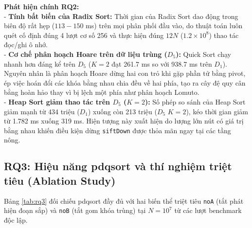 \documentclass[conference]{IEEEtran}
\begin{document}
\textbf{Phát hiện chính RQ2:}\\
- \textbf{Tính bất biến của Radix Sort:} Thời gian của Radix Sort dao động trong biên độ rất hẹp ($113 - 150$ ms) trên mọi phân phối đầu vào, do thuật toán luôn quét cố định đúng 4 lượt cơ số 256 và thực hiện đúng $12N$ ($1.2\times 10^8$) thao tác đọc/ghi ô nhớ.\\
- \textbf{Cơ chế phân hoạch Hoare trên dữ liệu trùng ($D_5$):} Quick Sort chạy nhanh hơn đáng kể trên $D_5$ ($K=2$ đạt 261.7 ms so với 938.7 ms trên $D_1$). Nguyên nhân là phân hoạch Hoare dừng hai con trỏ khi gặp phần tử bằng pivot, ép việc hoán đổi các khóa bằng nhau chia đều về hai phía, tạo ra cây đệ quy cân bằng hoàn hảo thay vì bị lệch một phía như phân hoạch Lomuto.\\
- \textbf{Heap Sort giảm thao tác trên $D_5$ ($K=2$):} Số phép so sánh của Heap Sort giảm mạnh từ 434 triệu ($D_1$) xuống còn 213 triệu ($D_5$ $K=2$), kéo thời gian giảm từ 1.782 ms xuống 319 ms. Hiện tượng này xuất hiện do lượng lớn nút có giá trị bằng nhau khiến điều kiện dừng \texttt{siftDown} được thỏa mãn ngay tại các tầng nông.

\subsection{RQ3: Hiệu năng pdqsort và thí nghiệm triệt tiêu (Ablation Study)}
Bảng \ref{tab:rq3} đối chiếu pdqsort đầy đủ với hai biến thể triệt tiêu \texttt{noA} (tắt phát hiện đoạn sắp) và \texttt{noB} (tắt gom khóa trùng) tại $N = 10^7$ từ các lượt benchmark độc lập.
\end{document}
